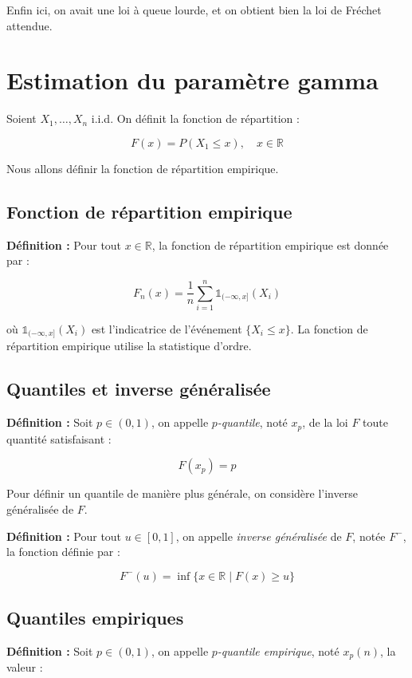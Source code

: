 \documentclass{article}
\begin{document}
\noindent Enfin ici, on avait une loi à queue lourde, et on obtient bien la loi de Fréchet attendue.

\newpage
\section{Estimation du paramètre gamma} 

Soient \(X_1, \dots, X_n\) i.i.d. On définit la fonction de répartition :

\[
F(x) = P(X_1 \leq x), \quad x \in \mathbb{R}
\]

Nous allons définir la fonction de répartition empirique.

\subsection{Fonction de répartition empirique}

\textbf{Définition :} Pour tout \(x \in \mathbb{R}\), la fonction de répartition empirique est donnée par :

\[
F_n(x) = \frac{1}{n} \sum_{i=1}^{n} \mathbb{1}_{(-\infty, x]}(X_i)
\]

où \(\mathbb{1}_{(-\infty, x]}(X_i)\) est l'indicatrice de l'événement \(\{X_i \leq x\}\).
La fonction de répartition empirique utilise la statistique d'ordre.

\subsection{Quantiles et inverse généralisée}

\textbf{Définition :} Soit \(p \in (0,1)\), on appelle \textit{\(p\)-quantile}, noté \(x_p\), de la loi \(F\) toute quantité satisfaisant :

\[
F(x_p) = p
\]

Pour définir un quantile de manière plus générale, on considère l'inverse généralisée de \(F\).

\textbf{Définition :} Pour tout \(u \in [0,1]\), on appelle \textit{inverse généralisée} de \(F\), notée \(F^-\), la fonction définie par :

\[
F^-(u) = \inf \{ x \in \mathbb{R} \mid F(x) \geq u \}
\]

\subsection{Quantiles empiriques}

\textbf{Définition :} Soit \(p \in (0,1)\), on appelle \textit{\(p\)-quantile empirique}, noté \(x_p(n)\), la valeur :
\end{document}
